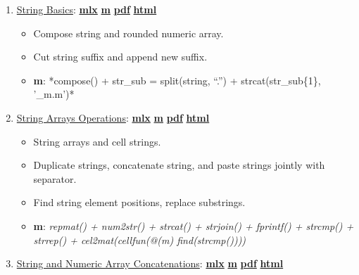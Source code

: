 \documentclass[
]{book}
\providecommand{\tightlist}{%
  \setlength{\itemsep}{0pt}\setlength{\parskip}{0pt}}
\begin{document}
\begin{enumerate}
\def\labelenumi{\arabic{enumi}.}
\tightlist
\item
  \href{https://fanwangecon.github.io/M4Econ/amto/string/htmlpdfm/fs_string.html}{String Basics}: \href{https://github.com/FanWangEcon/M4Econ/blob/master/amto/string/fs_string.mlx}{\textbf{mlx}} \textbar{} \href{https://github.com/FanWangEcon/M4Econ/blob/master/amto/string/htmlpdfm/fs_string.m}{\textbf{m}} \textbar{} \href{https://github.com/FanWangEcon/M4Econ/blob/master/amto/string/htmlpdfm/fs_string.pdf}{\textbf{pdf}} \textbar{} \href{https://fanwangecon.github.io/M4Econ/amto/string/htmlpdfm/fs_string.html}{\textbf{html}}

  \begin{itemize}
  \tightlist
  \item
    Compose string and rounded numeric array.
  \item
    Cut string suffix and append new suffix.
  \item
    \textbf{m}: *compose() + str\_sub = split(string, ``.'') + strcat(str\_sub\{1\}, '\_m.m')*
  \end{itemize}
\item
  \href{https://fanwangecon.github.io/M4Econ/amto/string/htmlpdfm/fs_string_array.html}{String Arrays Operations}: \href{https://github.com/FanWangEcon/M4Econ/blob/master/amto/string/fs_string_array.mlx}{\textbf{mlx}} \textbar{} \href{https://github.com/FanWangEcon/M4Econ/blob/master/amto/string/htmlpdfm/fs_string_array.m}{\textbf{m}} \textbar{} \href{https://github.com/FanWangEcon/M4Econ/blob/master/amto/string/htmlpdfm/fs_string_array.pdf}{\textbf{pdf}} \textbar{} \href{https://fanwangecon.github.io/M4Econ/amto/string/htmlpdfm/fs_string_array.html}{\textbf{html}}

  \begin{itemize}
  \tightlist
  \item
    String arrays and cell strings.
  \item
    Duplicate strings, concatenate string, and paste strings jointly with separator.
  \item
    Find string element positions, replace substrings.
  \item
    \textbf{m}: \emph{repmat() + num2str() + strcat() + strjoin() + fprintf() + strcmp() + strrep() + cel2mat(cellfun(@(m) find(strcmp())))}
  \end{itemize}
\item
  \href{https://fanwangecon.github.io/M4Econ/amto/string/htmlpdfm/fs_string_strcat.html}{String and Numeric Array Concatenations}: \href{https://github.com/FanWangEcon/M4Econ/blob/master/amto/string/fs_string_strcat.mlx}{\textbf{mlx}} \textbar{} \href{https://github.com/FanWangEcon/M4Econ/blob/master/amto/string/htmlpdfm/fs_string_strcat.m}{\textbf{m}} \textbar{} \href{https://github.com/FanWangEcon/M4Econ/blob/master/amto/string/htmlpdfm/fs_string_strcat.pdf}{\textbf{pdf}} \textbar{} \href{https://fanwangecon.github.io/M4Econ/amto/string/htmlpdfm/fs_string_strcat.html}{\textbf{html}}


\end{enumerate}
\end{document}

